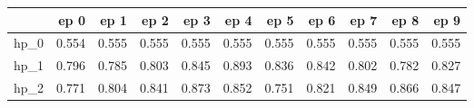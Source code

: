 \begin{tabular}{lrrrrrrrrrr}
\toprule
{} &   ep 0 &   ep 1 &   ep 2 &   ep 3 &   ep 4 &   ep 5 &   ep 6 &   ep 7 &   ep 8 &   ep 9 \\
\midrule
hp\_0 &  0.554 &  0.555 &  0.555 &  0.555 &  0.555 &  0.555 &  0.555 &  0.555 &  0.555 &  0.555 \\
hp\_1 &  0.796 &  0.785 &  0.803 &  0.845 &  0.893 &  0.836 &  0.842 &  0.802 &  0.782 &  0.827 \\
hp\_2 &  0.771 &  0.804 &  0.841 &  0.873 &  0.852 &  0.751 &  0.821 &  0.849 &  0.866 &  0.847 \\
\bottomrule
\end{tabular}
